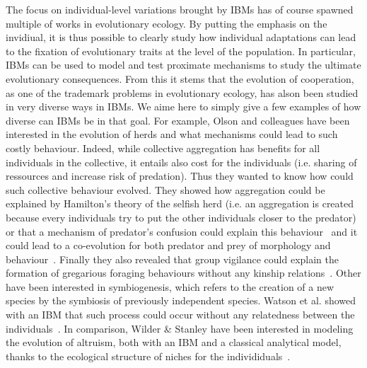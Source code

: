     The focus on individual-level variations brought by IBMs has of course spawned multiple of works in evolutionary ecology. By putting the emphasis on the invidiual, it is thus possible to clearly study how individual adaptations can lead to the fixation of evolutionary traits at the level of the population. In particular, IBMs can be used to model and test proximate mechanisms to study the ultimate evolutionary consequences. From this it stems that the evolution of cooperation, as one of the trademark problems in evolutionary ecology, has alson been studied in very diverse ways in IBMs. We aime here to simply give a few examples of how diverse can IBMs be in that goal. For example, Olson and colleagues have been interested in the evolution of herds and what mechanisms could lead to such costly behaviour. Indeed, while collective aggregation has benefits for all individuals in the collective, it entails also cost for the individuals (i.e. sharing of ressources and increase risk of predation). Thus they wanted to know how could such collective behaviour evolved. They showed how aggregation could be explained by Hamilton's theory of the selfish herd (i.e. an aggregation is created because every individuals try to put the other individuals closer to the predator)~\parencite{Olson2013a} or that a mechanism of predator's confusion could explain this behaviour~\parencite{Olson2013} and it could lead to a co-evolution for both predator and prey of morphology and behaviour~\parencite{Olson2016}. Finally they also revealed that group vigilance could explain the formation of gregarious foraging behaviours without any kinship relations~\parencite{Haley2014, Olson2014a}. Other have been interested in symbiogenesis, which refers to the creation of a new species by the symbiosis of previously independent species. Watson et al. showed with an IBM that such process could occur without any relatedness between the individuals~\parencite{Watson1992}. In comparison, Wilder \& Stanley have been interested in modeling the evolution of altruism, both with an IBM and a classical analytical model, thanks to the ecological structure of niches for the individiduals~\parencite{Wilder2015}.


